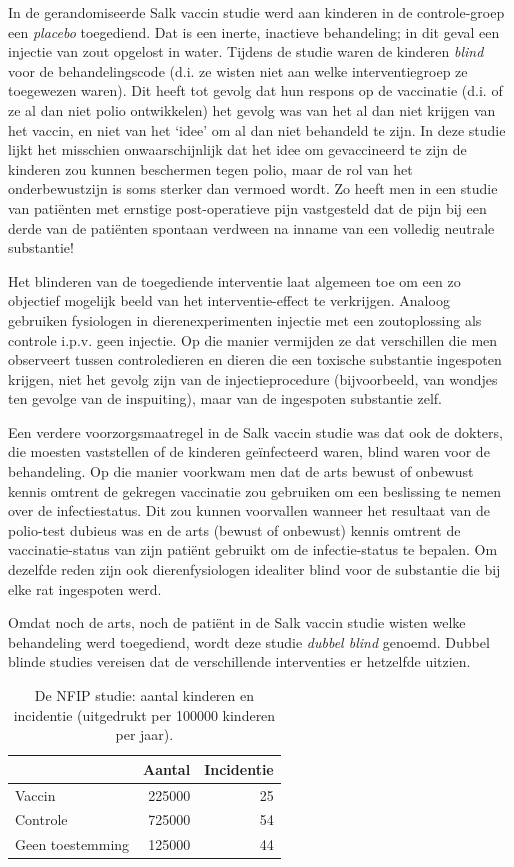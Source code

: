 \documentclass[
  12pt,dutch,coursenotes]{book}
\theoremstyle{definition}
\theoremstyle{definition}
\theoremstyle{definition}
\theoremstyle{definition}
\theoremstyle{remark}
\begin{document}
In de gerandomiseerde Salk vaccin studie werd aan kinderen in de
controle-groep een \emph{placebo} toegediend. Dat is een inerte, inactieve
behandeling; in dit geval een injectie van zout opgelost in water. Tijdens
de studie waren de kinderen \emph{blind} voor de behandelingscode (d.i. ze
wisten niet aan welke interventiegroep ze toegewezen waren). Dit heeft tot
gevolg dat hun respons op de vaccinatie (d.i. of ze al dan niet polio
ontwikkelen) het gevolg was van het al dan niet krijgen van het vaccin, en
niet van het `idee' om al dan niet behandeld te zijn. In deze studie lijkt het misschien onwaarschijnlijk dat het idee
om gevaccineerd te zijn de kinderen zou kunnen beschermen tegen polio, maar
de rol van het onderbewustzijn is soms sterker dan vermoed wordt. Zo heeft
men in een studie van patiënten met ernstige post-operatieve pijn
vastgesteld dat de pijn bij een derde van de patiënten spontaan verdween
na inname van een volledig neutrale substantie!

Het blinderen van de toegediende interventie laat algemeen toe om een zo objectief mogelijk
beeld van het interventie-effect te verkrijgen. Analoog gebruiken fysiologen in dierenexperimenten injectie met een zoutoplossing als controle i.p.v. geen injectie. Op die manier vermijden ze dat verschillen die men observeert tussen controledieren en dieren die een toxische substantie ingespoten krijgen, niet het gevolg zijn van de injectieprocedure (bijvoorbeeld, van wondjes ten gevolge van de inspuiting), maar van de ingespoten substantie zelf.

Een verdere voorzorgsmaatregel in de Salk vaccin studie was dat ook de
dokters, die moesten vaststellen of de kinderen geïnfecteerd waren,
blind waren voor de behandeling. Op die manier voorkwam men dat de arts
bewust of onbewust kennis omtrent de gekregen vaccinatie zou gebruiken om
een beslissing te nemen over de infectiestatus. Dit zou kunnen voorvallen
wanneer het resultaat van de polio-test dubieus was en de arts (bewust of
onbewust) kennis omtrent de vaccinatie-status van zijn patiënt gebruikt om
de infectie-status te bepalen. Om dezelfde reden zijn ook dierenfysiologen idealiter blind voor de substantie die bij elke rat ingespoten werd.

Omdat noch de arts, noch de patiënt in de Salk vaccin studie wisten welke
behandeling werd toegediend, wordt deze studie \emph{dubbel blind}
genoemd. Dubbel blinde studies vereisen dat de verschillende interventies er
hetzelfde uitzien.

\begin{table}

\caption{\label{tab:nfipStudy}De NFIP studie: aantal kinderen en incidentie (uitgedrukt per
100000 kinderen per jaar).}
\centering
\begin{tabular}[t]{lrr}
\toprule
  & Aantal & Incidentie\\
\midrule
Vaccin & 225000 & 25\\
Controle & 725000 & 54\\
Geen toestemming & 125000 & 44\\
\bottomrule
\end{tabular}
\end{table}
\end{document}
